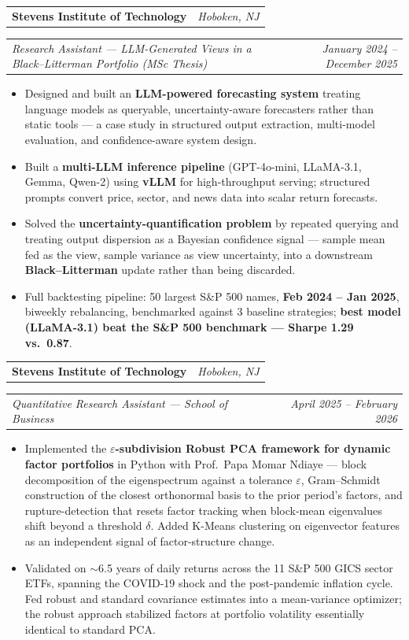 \documentclass[10pt,letterpaper]{article}
\makeatletter
\newcommand{\entryrow}[2]{%
  \noindent\begin{tabularx}{\linewidth}{@{}X@{}r@{}}%
    #1 & #2 \\
  \end{tabularx}\par\vspace{1pt}%
}
\newcommand{\headline}[4]{%
  \entryrow{\textbf{#1}}{\normalfont\itshape #2}%
  \entryrow{\textit{#3}}{\normalfont\itshape #4}%
}
\makeatother
\begin{document}
\vspace{4pt}
\headline{Stevens Institute of Technology}{Hoboken, NJ}{Research Assistant --- LLM-Generated Views in a Black--Litterman Portfolio (MSc Thesis)}{January 2024 -- December 2025}
\begin{itemize}
  \item Designed and built an \textbf{LLM-powered forecasting system} treating language models as queryable, uncertainty-aware forecasters rather than static tools --- a case study in structured output extraction, multi-model evaluation, and confidence-aware system design.
  \item Built a \textbf{multi-LLM inference pipeline} (GPT-4o-mini, LLaMA-3.1, Gemma, Qwen-2) using \textbf{vLLM} for high-throughput serving; structured prompts convert price, sector, and news data into scalar return forecasts.
  \item Solved the \textbf{uncertainty-quantification problem} by repeated querying and treating output dispersion as a Bayesian confidence signal --- sample mean fed as the view, sample variance as view uncertainty, into a downstream \textbf{Black--Litterman} update rather than being discarded.
  \item Full backtesting pipeline: 50 largest S\&P 500 names, \textbf{Feb 2024 -- Jan 2025}, biweekly rebalancing, benchmarked against 3 baseline strategies; \textbf{best model (LLaMA-3.1) beat the S\&P 500 benchmark --- Sharpe 1.29 vs.\ 0.87}.
\end{itemize}

\vspace{4pt}
\headline{Stevens Institute of Technology}{Hoboken, NJ}{Quantitative Research Assistant --- School of Business}{April 2025 -- February 2026}
\begin{itemize}
  \item Implemented the \textbf{$\varepsilon$-subdivision Robust PCA framework for dynamic factor portfolios} in Python with Prof.\ Papa Momar Ndiaye --- block decomposition of the eigenspectrum against a tolerance $\varepsilon$, Gram--Schmidt construction of the closest orthonormal basis to the prior period's factors, and rupture-detection that resets factor tracking when block-mean eigenvalues shift beyond a threshold $\delta$. Added K-Means clustering on eigenvector features as an independent signal of factor-structure change.
  \item Validated on $\sim$6.5 years of daily returns across the 11 S\&P 500 GICS sector ETFs, spanning the COVID-19 shock and the post-pandemic inflation cycle. Fed robust and standard covariance estimates into a mean-variance optimizer; the robust approach stabilized factors at portfolio volatility essentially identical to standard PCA.
\end{itemize}
\end{document}
